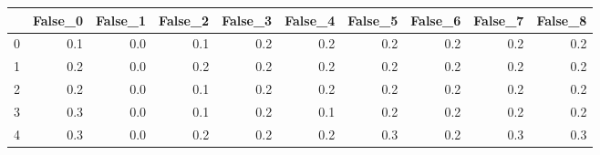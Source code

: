 \begin{tabular}{lrrrrrrrrr}
\toprule
{} &  False\_0 &  False\_1 &  False\_2 &  False\_3 &  False\_4 &  False\_5 &  False\_6 &  False\_7 &  False\_8 \\ \hline
\midrule
0 &      0.1 &      0.0 &      0.1 &      0.2 &      0.2 &      0.2 &      0.2 &      0.2 &      0.2 \\ \hline
1 &      0.2 &      0.0 &      0.2 &      0.2 &      0.2 &      0.2 &      0.2 &      0.2 &      0.2 \\ \hline
2 &      0.2 &      0.0 &      0.1 &      0.2 &      0.2 &      0.2 &      0.2 &      0.2 &      0.2 \\ \hline
3 &      0.3 &      0.0 &      0.1 &      0.2 &      0.1 &      0.2 &      0.2 &      0.2 &      0.2 \\ \hline
4 &      0.3 &      0.0 &      0.2 &      0.2 &      0.2 &      0.3 &      0.2 &      0.3 &      0.3 \\ \hline
\bottomrule
\end{tabular}
